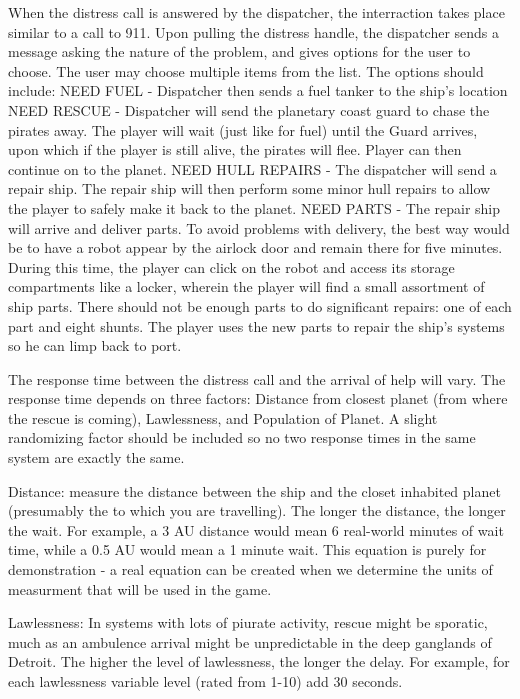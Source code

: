 When the distress call is answered by the dispatcher, the interraction takes place similar to a call to 911. Upon pulling the distress handle, the dispatcher sends a message asking the nature of the problem, and gives options for the user to choose. The user may choose multiple items from the list. The options should include: 
NEED FUEL - Dispatcher then sends a fuel tanker to the ship's location
NEED RESCUE - Dispatcher will send the planetary coast guard to chase the pirates away. The player will wait (just like for fuel) until the Guard arrives, upon which if the player is still alive, the pirates will flee. Player can then continue on to the planet. 
NEED HULL REPAIRS - The dispatcher will send a repair ship. The repair ship will then perform some minor hull repairs to allow the player to safely make it back to the planet. 
NEED PARTS - The repair ship will arrive and deliver parts. To avoid problems with delivery, the best way would be to have a robot appear by the airlock door and remain there for five minutes. During this time, the player can click on the robot and access its storage compartments like a locker, wherein the player will find a small assortment of ship parts. There should not be enough parts to do significant repairs: one of each part and eight shunts.  The player uses the new parts to repair the ship's systems so he can limp back to port. 

The response time between the distress call and the arrival of help will vary. The response time depends on three factors: Distance from closest planet (from where the rescue is coming), Lawlessness, and Population of Planet. A slight randomizing factor should be included so no two response times in the same system are exactly the same. 
 
Distance: measure the distance between the ship and the closet inhabited planet (presumably the to which you are travelling). The longer the distance, the longer the wait. For example, a 3 AU distance would mean 6 real-world minutes of wait time, while a 0.5 AU would mean a 1 minute wait. This equation is purely for demonstration - a real equation can be created when we determine the units of measurment that will be used in the game. 

Lawlessness: In systems with lots of piurate activity, rescue might be sporatic, much as an ambulence arrival might be unpredictable in the deep ganglands of Detroit. The higher the level of lawlessness, the longer the delay. For example, for each lawlessness variable level (rated from 1-10) add 30 seconds. 

